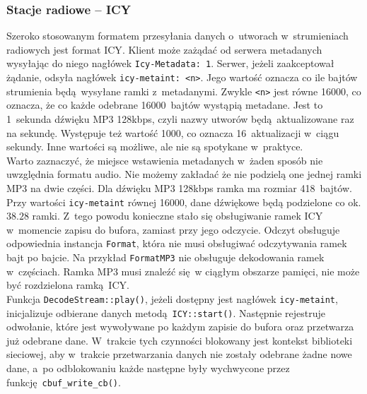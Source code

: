 \documentclass[polish]{aghengthesis}
\begin{document}
		\subsubsection{Stacje radiowe -- ICY}
			Szeroko stosowanym formatem przesyłania danych o~utworach w~strumieniach radiowych jest format ICY\textsuperscript{\cite{icy_spec}}. Klient może zażądać od serwera metadanych wysyłając do niego nagłówek \lstinline|Icy-Metadata: 1|. Serwer, jeżeli zaakceptował żądanie, odsyła nagłówek \lstinline|icy-metaint: <n>|. Jego wartość oznacza co ile bajtów strumienia będą wysyłane ramki z~metadanymi. Zwykle \lstinline|<n>| jest równe 16000, co oznacza, że co każde odebrane 16000~bajtów wystąpią metadane. Jest to 1~sekunda dźwięku MP3 128kbps, czyli nazwy utworów będą aktualizowane raz na sekundę. Występuje też wartość 1000, co oznacza 16~aktualizacji w~ciągu sekundy. Inne wartości są możliwe, ale nie są spotykane w~praktyce.
			$ $\\
			
			Warto zaznaczyć, że miejsce wstawienia metadanych w~żaden sposób nie uwzględnia formatu audio. Nie możemy zakładać że nie podzielą one jednej ramki MP3 na dwie części. Dla dźwięku MP3 128kbps ramka ma rozmiar 418~bajtów. Przy wartości \lstinline|icy-metaint| równej 16000, dane dźwiękowe będą podzielone co ok. $38.28$ ramki. Z~tego powodu konieczne stało się obsługiwanie ramek ICY w~momencie zapisu do bufora, zamiast przy jego odczycie. Odczyt obsługuje odpowiednia instancja \lstinline|Format|, która nie musi obsługiwać odczytywania ramek bajt po bajcie. Na przykład \lstinline|FormatMP3| nie obsługuje dekodowania ramek w~częściach. Ramka MP3 musi znaleźć się w ciągłym obszarze pamięci, nie może być rozdzielona ramką ICY.
			$ $\\
			
			Funkcja \lstinline|DecodeStream::play()|, jeżeli dostępny jest nagłówek \lstinline|icy-metaint|, inicjalizuje odbierane danych metodą \lstinline|ICY::start()|. Następnie rejestruje odwołanie, które jest wywoływane po każdym zapisie do bufora oraz przetwarza już odebrane dane. W~trakcie tych czynności blokowany jest kontekst biblioteki sieciowej, aby w~trakcie przetwarzania danych nie zostały odebrane żadne nowe dane, a~po odblokowaniu każde następne były wychwycone przez funkcję \lstinline|cbuf_write_cb()|.
			$ $\\
			
\end{document}
